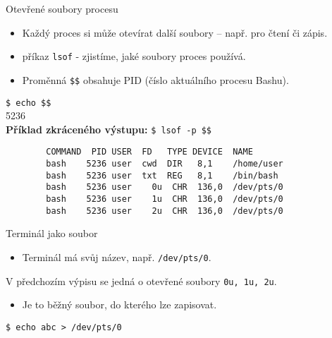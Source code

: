 \documentclass{beamer}
\begin{document}
\begin{frame}[fragile]{Otevřené soubory procesu}
	\begin{itemize}
		\item Každý proces si může otevírat další soubory – např. pro čtení či zápis.
		\item příkaz \texttt{lsof} - zjistíme, jaké soubory proces používá.
		\item Proměnná \texttt{\$\$} obsahuje PID (číslo aktuálního procesu Bashu).
	\end{itemize}
	
	\vspace{0.2em}
	\hspace{2em}\texttt{\$ echo \$\$} \\
	\hspace{2em}5236 \\[0.6em]
	
	\vspace{0.8em}
	\textbf{Příklad zkráceného výstupu:} \hspace{1em}\texttt{\$ lsof -p \$\$} \\
	\begin{verbatim}
		COMMAND  PID USER  FD   TYPE DEVICE  NAME
		bash    5236 user  cwd  DIR   8,1    /home/user
		bash    5236 user  txt  REG   8,1    /bin/bash
		bash    5236 user    0u  CHR  136,0  /dev/pts/0
		bash    5236 user    1u  CHR  136,0  /dev/pts/0
		bash    5236 user    2u  CHR  136,0  /dev/pts/0
	\end{verbatim}
\end{frame}


\begin{frame}[fragile]{Terminál jako soubor}
	\begin{itemize}
		\item Terminál má svůj název, např. \texttt{/dev/pts/0}.
			\end{itemize}
		\hspace{2em}V předchozím výpisu se jedná o otevřené soubory \texttt{0u, 1u, 2u}.
	\begin{itemize}		
		\item Je to běžný soubor, do kterého lze zapisovat.
	\end{itemize}
	\vspace{0.5em}
	\hspace{2em}\texttt{\$ echo abc > /dev/pts/0}
\end{frame}
\end{document}
